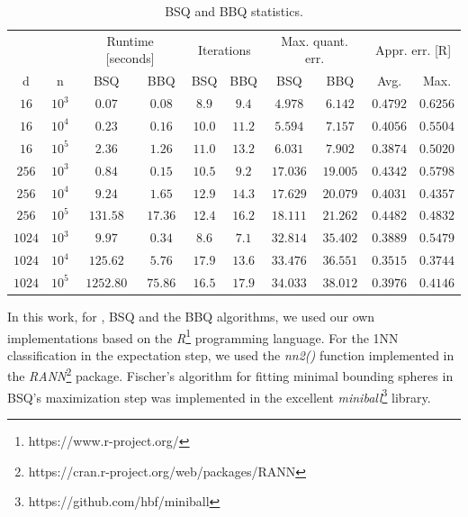 			\begin{table}[ht]
				\centering
				\begin{tabular}{|c|c|c|c|c|c|c|c|c|c|}
					\hline
					& & \multicolumn{2}{c|}{Runtime [seconds]} & \multicolumn{2}{c|}{Iterations} & \multicolumn{2}{c|}{Max. quant. err.} & \multicolumn{2}{c|}{Appr. err. [R]} \\
					d       & n         & BSQ       & BBQ     & BSQ     & BBQ       & BSQ       & BBQ       & Avg.      & Max. \\ 
					\hline
					$16$   	& $10^3$	& $0.07$   	& $0.08$  & $8.9$   & $9.4$  	& $4.978$  	& $6.142$  	& $0.4792$ 	& $0.6256$ \\
					$16$   	& $10^4$ 	& $0.23$   	& $0.16$  & $10.0$  & $11.2$ 	& $5.594$  	& $7.157$  	& $0.4056$ 	& $0.5504$ \\
					$16$   	& $10^5$ 	& $2.36$  	& $1.26$  & $11.0$  & $13.2$ 	& $6.031$  	& $7.902$  	& $0.3874$ 	& $0.5020$ \\
					$256$  	& $10^3$ 	& $0.84$    & $0.15$  & $10.5$  & $9.2$  	& $17.036$ 	& $19.005$ 	& $0.4342$ 	& $0.5798$ \\
					$256$  	& $10^4$ 	& $9.24$  	& $1.65$  & $12.9$  & $14.3$ 	& $17.629$  & $20.079$  & $0.4031$  & $0.4357$ \\
					$256$  	& $10^5$ 	& $131.58$ 	& $17.36$ & $12.4$  & $16.2$ 	& $18.111$	& $21.262$  & $0.4482$  & $0.4832$ \\
					$1024$ 	& $10^3$ 	& $9.97$ 	& $0.34$  & $8.6$   & $7.1$  	& $32.814$  & $35.402$  & $0.3889$ 	& $0.5479$ \\
					$1024$ 	& $10^4$ 	& $125.62$ 	& $5.76$  & $17.9$  & $13.6$    & $33.476$ 	& $36.551$  & $0.3515$ 	& $0.3744$ \\
					$1024$ 	& $10^5$	& $1252.80$	& $75.86$ & $16.5$  & $17.9$    & $34.033$  & $38.012$  & $0.3976$ 	& $0.4146$ \\
					\hline
				\end{tabular}
				\caption[BSQ and BBQ statistics]{BSQ and BBQ statistics.}
				\label{tab:bsbq}
			\end{table}
			
			In this work, for \kmeans{}, \ac{BSQ} and the \ac{BBQ} algorithms, we used our own implementations based on the \textit{R}\footnote{https://www.r-project.org/} programming language.
			For the \ac{1NN} classification in the expectation step, we used the \textit{nn2()} function implemented in the \textit{RANN}\footnote{https://cran.r-project.org/web/packages/RANN} package.
			Fischer's algorithm for fitting minimal bounding spheres in \ac{BSQ}'s maximization step was implemented in the excellent \textit{miniball}\footnote{https://github.com/hbf/miniball} library.
			
